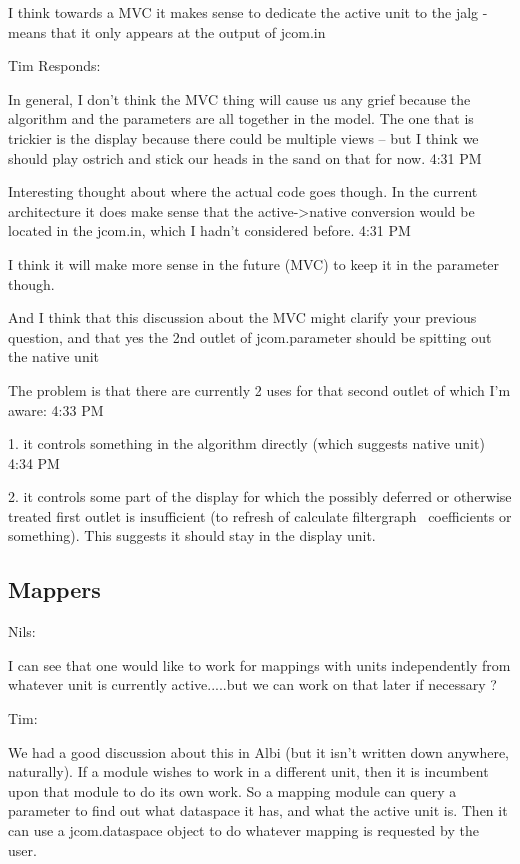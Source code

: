 \documentclass[]{article}
\begin{document}
I think towards a MVC it makes sense to dedicate the active unit to the jalg - means that it only appears at the output of jcom.in


Tim Responds:

In general, I don't think the MVC thing will cause us any grief because the algorithm and the parameters are all together in the model.  The one that is trickier is the display because there could be multiple views -- but I think we should play ostrich and stick our heads in the sand on that for now.
4:31 PM
 
Interesting thought about where the actual code goes though.  In the current architecture it does make sense that the active->native conversion would be located in the jcom.in, which I hadn't considered before.
4:31 PM
 
I think it will make more sense in the future (MVC) to keep it in the parameter though.

And I think that this discussion about the MVC might clarify your previous question, and that yes the 2nd outlet of jcom.parameter should be spitting out the native unit

The problem is that there are currently 2 uses for that second outlet of which I'm aware:
4:33 PM
 
1. it controls something in the algorithm directly (which suggests native unit)
4:34 PM
 
2. it controls some part of the display for which the possibly deferred or otherwise treated first outlet is insufficient (to refresh of calculate filtergraph~ coefficients or something).  This suggests it should stay in the display unit.


\subsection{Mappers}

Nils:

I can see that one would like to work for mappings with units independently from whatever unit is currently active.....but we can work on that later if necessary ?

Tim:

We had a good discussion about this in Albi (but it isn't written down anywhere, naturally).  If a module wishes to work in a different unit, then it is incumbent upon that module to do its own work.  So a mapping module can query a parameter to find out what dataspace it has, and what the active unit is.  Then it can use a jcom.dataspace object to do whatever mapping is requested by the user.
\end{document}
